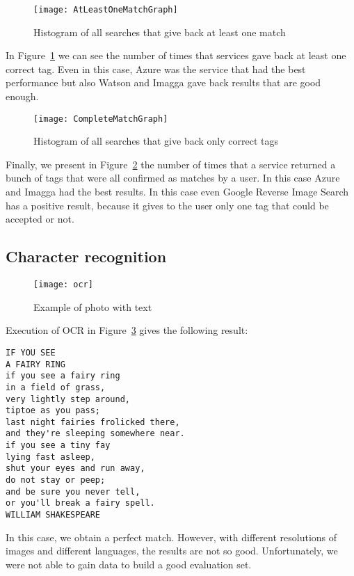 \begin{figure}[H]
\centering
\texttt{[image: AtLeastOneMatchGraph]}
\caption{Histogram of all searches that give back at least one match}
\label{img:testatleastone}
\end{figure}

In Figure~\ref{img:testatleastone} we can see the number of times that services 
gave back at least one correct tag. Even in this case, Azure was the service 
that had the best performance but also Watson and Imagga gave back results that 
are good enough.

\begin{figure}[H]
\centering
\texttt{[image: CompleteMatchGraph]}
\caption{Histogram of all searches that give back only correct tags}
\label{img:testcompletematch}
\end{figure}

Finally, we present in Figure~\ref{img:testcompletematch} the number of times 
that a service returned a bunch of tags that were all confirmed as matches by a 
user. In this case Azure and Imagga had the best results. In this case even 
Google Reverse Image Search has a positive result, because it gives to the user 
only one tag that could be accepted or not.

\subsection{Character recognition}

\begin{figure}[H]
\centering
\texttt{[image: ocr]}
\caption{Example of photo with text}
\label{testOCR}
\end{figure}

Execution of OCR in Figure~\ref{testOCR} gives the following result:
\begin{lstlisting}
IF YOU SEE
A FAIRY RING
if you see a fairy ring
in a field of grass,
very lightly step around,
tiptoe as you pass;
last night fairies frolicked there,
and they're sleeping somewhere near.
if you see a tiny fay
lying fast asleep,
shut your eyes and run away,
do not stay or peep;
and be sure you never tell,
or you'll break a fairy spell.
WILLIAM SHAKESPEARE
\end{lstlisting}

In this case, we obtain a perfect match. However, with different resolutions of 
images and different languages, the results are not so good. Unfortunately, we 
were not able to gain data to build a good evaluation set.